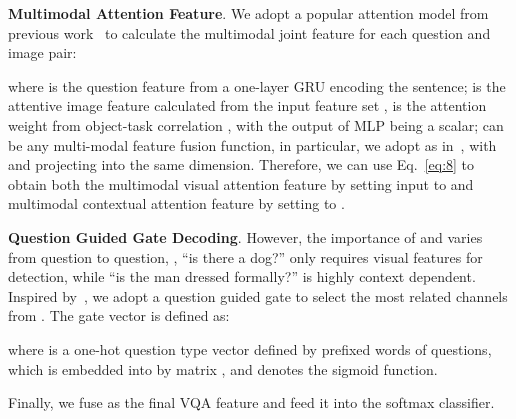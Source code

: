 \documentclass[10pt,twocolumn,letterpaper]{article}
\begin{document}
\noindent\textbf{Multimodal Attention Feature}. We adopt a popular attention model from previous work~\cite{anderson2018bottom, Teney_2018_CVPR} to calculate the multimodal joint feature  for each question and image pair:

where  is the question feature from a one-layer GRU encoding the sentence;  is the attentive image feature calculated from the input feature set ,  is the attention weight from object-task correlation , with the output of MLP being a scalar;  can be any multi-modal feature fusion function, in particular,  we adopt  as in~\cite{zhang2018learning}, with  and  projecting  into the same dimension. Therefore, we can use Eq.~\eqref{eq:8} to obtain both the multimodal visual attention feature  by setting input  to  and multimodal contextual attention feature  by setting  to .

\noindent\textbf{Question Guided Gate Decoding}. However, the importance of  and  varies from question to question, \eg, ``is there a dog?'' only requires visual features for detection, while ``is the man dressed formally?'' is highly context dependent. Inspired by~\cite{Shi_2018_ECCV}, we adopt a question guided gate to select the most related channels from . The gate vector  is defined as:

where  is a one-hot question type vector defined by prefixed words of questions, which is embedded into  by matrix , and  denotes the sigmoid function. 

Finally, we fuse  as the final VQA feature and feed it into the softmax classifier.
\end{document}
